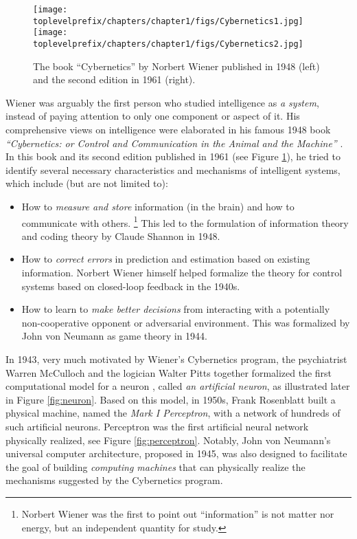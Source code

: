 \documentclass[\toplevelprefix/book-main.tex]{subfiles}
\begin{document}
\begin{figure}
    \centering
    \texttt{[image: \\toplevelprefix/chapters/chapter1/figs/Cybernetics1.jpg]}
    \hspace{10mm} \texttt{[image: \\toplevelprefix/chapters/chapter1/figs/Cybernetics2.jpg]}
    \caption{The book ``Cybernetics'' by Norbert Wiener published in 1948 \cite{Wiener-Cybernetics-1948} (left) and the second edition in 1961 \cite{Wiener-Cybernetics-1961} (right).}
    \label{fig:cybernetcis}
\end{figure}


Wiener was arguably the first person who studied intelligence as {\em a system}, instead of paying attention to only one component or aspect of it. His comprehensive views on intelligence were elaborated in his famous 1948 book {\em ``Cybernetics: or Control and Communication in the Animal and the Machine''} \cite{Wiener-Cybernetics-1948}. In this book and its second edition published in 1961 \cite{Wiener-Cybernetics-1961} (see Figure \ref{fig:cybernetcis}), he tried to identify several necessary characteristics and mechanisms of intelligent systems, which include (but are not limited to):
\begin{itemize}
    \item How to {\em measure and store} information (in the brain) and how to communicate with others. \footnote{Norbert Wiener was the first to point out ``information'' is not matter nor energy, but an independent quantity for study.} This led to the formulation of information theory and coding theory by Claude Shannon in 1948.
    \item How to {\em correct errors}  in prediction and estimation based on existing information. Norbert Wiener himself helped formalize the theory for control systems based on closed-loop feedback in the 1940s. 
    \item How to learn to {\em make better decisions} from interacting with a potentially non-cooperative opponent or adversarial environment. This was formalized by John von Neumann as game theory in 1944. 
\end{itemize}
In 1943, very much motivated by Wiener's Cybernetics program, the psychiatrist Warren McCulloch and the logician Walter Pitts together formalized the first computational model for a neuron \cite{McCulloch-Pitts}, called {\em an artificial neuron}, as illustrated later in Figure \ref{fig:neuron}. Based on this model, in 1950s, Frank Rosenblatt built a physical machine, named the {\em Mark I Perceptron}, with a network of hundreds of such artificial neurons. Perceptron was the first artificial neural network physically realized, see Figure \ref{fig:perceptron}. Notably, John von Neumann's universal computer architecture, proposed in 1945, was also designed to facilitate the goal of building {\em computing machines} that can physically realize the mechanisms suggested by the Cybernetics program. 
\end{document}

